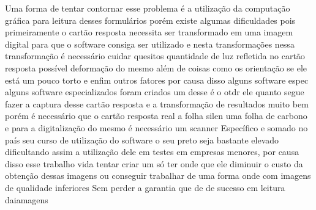 Uma forma de tentar contornar esse problema é a utilização da computação gráfica para leitura desses formulários porém existe algumas dificuldades pois primeiramente o cartão resposta necessita ser transformado em uma imagem digital para que o software consiga ser utilizado e nesta transformações nessa transformação é necessário cuidar quesitos quantidade de luz refletida no cartão resposta possível deformação do mesmo além de coisas como os orientação se ele está um pouco torto e enfim outros fatores por causa disso alguns software espec alguns software especializados foram criados um desse é o otdr ele quanto segue fazer a captura desse cartão resposta e a transformação de resultados muito bem porém é necessário que o cartão resposta real a folha silen uma folha de carbono e para a digitalização do mesmo é necessário um scanner Específico e somado no país seu curso de utilização do software o seu preto seja bastante elevado dificultando assim a utilização dele em testes em empresas menores, por causa disso esse trabalho vida tentar criar um só ter onde que ele diminuir o custo da obtenção dessas imagens ou conseguir trabalhar de uma forma onde com imagens de qualidade inferiores Sem perder a garantia que de de sucesso em leitura daiamagens